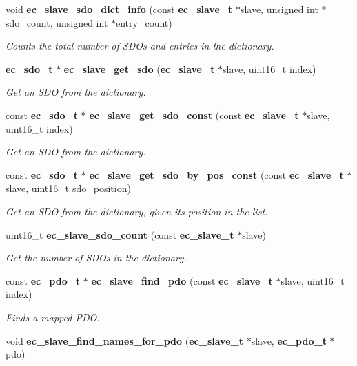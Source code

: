 \begin{DoxyCompactItemize}
void {\bf ec\-\_\-slave\-\_\-sdo\-\_\-dict\-\_\-info} (const {\bf ec\-\_\-slave\-\_\-t} $\ast$slave, unsigned int $\ast$sdo\-\_\-count, unsigned int $\ast$entry\-\_\-count)
\begin{DoxyCompactList}\small\item\em \-Counts the total number of \-S\-D\-Os and entries in the dictionary. \end{DoxyCompactList}\item 
{\bf ec\-\_\-sdo\-\_\-t} $\ast$ {\bf ec\-\_\-slave\-\_\-get\-\_\-sdo} ({\bf ec\-\_\-slave\-\_\-t} $\ast$slave, uint16\-\_\-t index)
\begin{DoxyCompactList}\small\item\em \-Get an \-S\-D\-O from the dictionary. \end{DoxyCompactList}\item 
const {\bf ec\-\_\-sdo\-\_\-t} $\ast$ {\bf ec\-\_\-slave\-\_\-get\-\_\-sdo\-\_\-const} (const {\bf ec\-\_\-slave\-\_\-t} $\ast$slave, uint16\-\_\-t index)
\begin{DoxyCompactList}\small\item\em \-Get an \-S\-D\-O from the dictionary. \end{DoxyCompactList}\item 
const {\bf ec\-\_\-sdo\-\_\-t} $\ast$ {\bf ec\-\_\-slave\-\_\-get\-\_\-sdo\-\_\-by\-\_\-pos\-\_\-const} (const {\bf ec\-\_\-slave\-\_\-t} $\ast$slave, uint16\-\_\-t sdo\-\_\-position)
\begin{DoxyCompactList}\small\item\em \-Get an \-S\-D\-O from the dictionary, given its position in the list. \end{DoxyCompactList}\item 
uint16\-\_\-t {\bf ec\-\_\-slave\-\_\-sdo\-\_\-count} (const {\bf ec\-\_\-slave\-\_\-t} $\ast$slave)
\begin{DoxyCompactList}\small\item\em \-Get the number of \-S\-D\-Os in the dictionary. \end{DoxyCompactList}\item 
const {\bf ec\-\_\-pdo\-\_\-t} $\ast$ {\bf ec\-\_\-slave\-\_\-find\-\_\-pdo} (const {\bf ec\-\_\-slave\-\_\-t} $\ast$slave, uint16\-\_\-t index)
\begin{DoxyCompactList}\small\item\em \-Finds a mapped \-P\-D\-O. \end{DoxyCompactList}\item 
void {\bf ec\-\_\-slave\-\_\-find\-\_\-names\-\_\-for\-\_\-pdo} ({\bf ec\-\_\-slave\-\_\-t} $\ast$slave, {\bf ec\-\_\-pdo\-\_\-t} $\ast$pdo)\label{slave_8c_a631c175754fd611998871d85cbf14b6a}


\end{DoxyCompactItemize}
